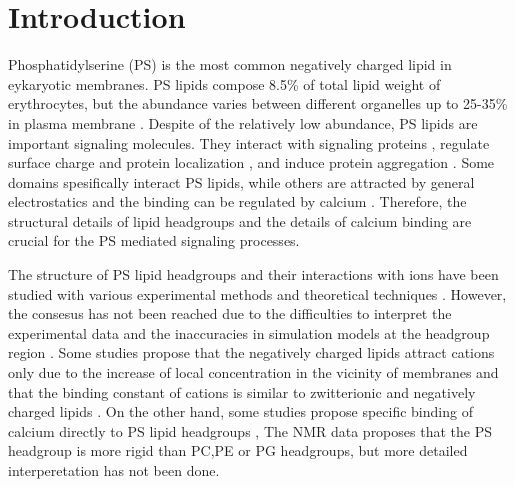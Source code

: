 \documentclass[aps,prl,superscriptaddress,twocolumn]{revtex4}
\begin{document}


\section{Introduction}
Phosphatidylserine (PS) is the most common negatively
charged lipid in eykaryotic membranes.
PS lipids compose 8.5\% of total lipid weight of erythrocytes,
but the abundance varies between different organelles up to
25-35\% in plasma membrane \cite{lemmon08,leventis10,li14}.
Despite of the relatively low abundance, PS lipids
are important signaling molecules. They interact with
signaling proteins \cite{leventis10}, regulate
surface charge and protein localization \cite{yeung08}, and
induce protein aggregation \cite{zhao04,gorbenko06}.
Some domains spesifically interact PS lipids,
while others are attracted by general electrostatics and the
binding can be regulated by calcium \cite{leventis10}.
Therefore, the structural details
of lipid headgroups and the details of calcium binding
are crucial for the PS mediated signaling processes.

The structure of PS lipid headgroups and their 
interactions with ions have been studied with
various experimental methods and theoretical techniques \cite{roux90,melcrova16,??}.
However, the consesus has not been reached 
due to the difficulties to interpret the experimental data \cite{??} and
the inaccuracies in simulation models at the
headgroup region \cite{botan15,catte16,ollila16}.
Some studies propose that the negatively charged lipids
attract cations only due to the increase of local concentration
in the vicinity of membranes and that the binding constant of cations is similar
to zwitterionic and negatively charged lipids \cite{seelig90,sinn06,??}.
On the other hand, some studies propose specific binding of calcium directly to PS lipid
headgroups \cite{vernier09,boettcher11,??},
The NMR data proposes that the PS headgroup is more rigid than PC,PE or PG
headgroups, but more detailed interperetation has not been done.

\end{document}

